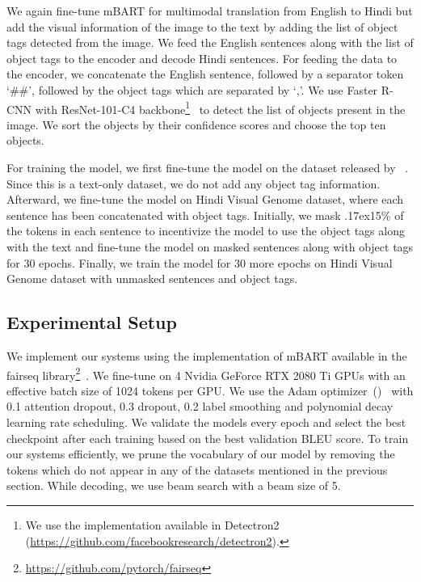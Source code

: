 \documentclass[11pt,a4paper]{article}
\newcommand{\approximately}{{\raise.17ex\hbox{}}}
\begin{document}
We again fine-tune mBART for multimodal translation from English to Hindi but add the visual information of the image to the text by adding the list of object tags detected from the image.
We feed the English sentences along with the list of object tags to the encoder and decode Hindi sentences. For feeding the data to the encoder, we concatenate the English sentence, followed by a separator token `\#\#', followed by the object tags which are separated by `,'.  We use Faster R-CNN with ResNet-101-C4 backbone\footnote{We use the implementation available in Detectron2 (\url{https://github.com/facebookresearch/detectron2}).}~\citep{DBLP:conf/nips/RenHGS15} to detect the list of objects present in the image. We sort the objects by their confidence scores and choose the top ten objects.

For training the model, we first fine-tune the model on the dataset released by ~\citet{kunchukuttan-etal-2018-iit}. Since this is a text-only dataset, we do not add any object tag information. Afterward, we fine-tune the model on Hindi Visual Genome dataset, where each sentence has been concatenated with object tags. Initially, we mask \approximately15\% of the tokens in each sentence to incentivize the model to use the object tags along with the text and fine-tune the model on masked sentences along with object tags for 30 epochs. Finally, we train the model for 30 more epochs on Hindi Visual Genome dataset with unmasked sentences and object tags.


\subsection{Experimental Setup} 



We implement our systems using the implementation of mBART available in the fairseq library\footnote{\url{https://github.com/pytorch/fairseq}}~\citep{ott-etal-2019-fairseq}. We fine-tune on 4 Nvidia GeForce RTX 2080 Ti GPUs with an effective batch size of 1024 tokens per GPU. We use the Adam optimizer~()~\citep{adamoptimizer} with 0.1 attention dropout, 0.3 dropout, 0.2 label smoothing and polynomial decay learning rate scheduling. We validate the models every epoch and select the best checkpoint after each training based on the best validation BLEU score. To train our systems efficiently, we prune the vocabulary of our model by removing the tokens which do not appear in any of the datasets mentioned in the previous section. While decoding, we use beam search with a beam size of 5.
\end{document}
